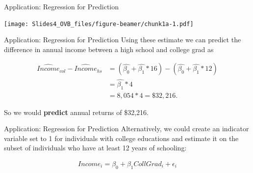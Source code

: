 \documentclass[
  ignorenonframetext,
]{beamer}
\newenvironment{Shaded}{\begin{snugshade}}{\end{snugshade}}
\newcommand{\DecValTok}[1]{\textcolor[rgb]{0.00,0.00,0.81}{#1}}
\newcommand{\FunctionTok}[1]{\textcolor[rgb]{0.00,0.00,0.00}{#1}}
\newcommand{\NormalTok}[1]{#1}
\newcommand{\SpecialCharTok}[1]{\textcolor[rgb]{0.00,0.00,0.00}{#1}}
\begin{document}
\begin{frame}[fragile]{Application: Regression for Prediction}
\protect\hypertarget{application-regression-for-prediction-4}{}
\tiny

\begin{Shaded}
\end{Shaded}

\texttt{[image: Slides4\_OVB\_files/figure-beamer/chunk1a-1.pdf]}
\end{frame}

\begin{frame}{Application: Regression for Prediction}
\protect\hypertarget{application-regression-for-prediction-5}{}
Using these estimate we can predict the difference in annual income
between a high school and college grad as

\[\begin{aligned}
\widehat{Income}_{col}-\widehat{Income}_{hs} & =(\hat{\beta_0}+\hat{\beta_1}*16)-(\hat{\beta_0}+\hat{\beta_1}*12)\\
& =\hat{\beta_1}*4\\
& = 8,054*4=\$32,216.
\end{aligned}\]

So we would \textbf{predict} annual returns of \$32,216.
\end{frame}

\begin{frame}{Application: Regression for Prediction}
\protect\hypertarget{application-regression-for-prediction-6}{}
Alternatively, we could create an indicator variable set to 1 for
individuals with college educations and estimate it on the subset of
individuals who have at least 12 years of schooling:

\begin{equation}
\begin{split}
Income_i=\beta_0+\beta_1 CollGrad_i+\epsilon_i
\end{split}
\end{equation}
\end{frame}
\end{document}
